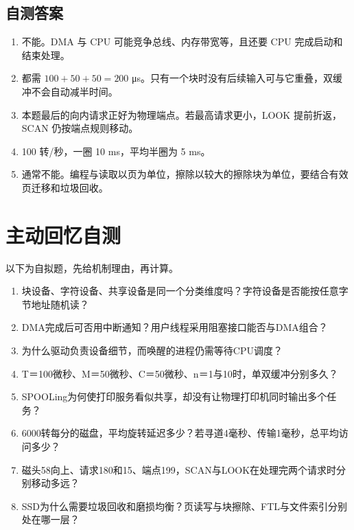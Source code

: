 \subsection{自测答案}\label{OS05-auto-3}

\begin{enumerate}
\def\labelenumi{\arabic{enumi}.}
\tightlist
\item
  不能。DMA 与 CPU 可能竞争总线、内存带宽等，且还要 CPU 完成启动和结束处理。
\item
  都需 \(100+50+50=200\) μs。只有一个块时没有后续输入可与它重叠，双缓冲不会自动减半时间。
\item
  本题最后的向内请求正好为物理端点。若最高请求更小，LOOK 提前折返，SCAN 仍按端点规则移动。
\item
  100 转/秒，一圈 10 ms，平均半圈为 5 ms。
\item
  通常不能。编程与读取以页为单位，擦除以较大的擦除块为单位，要结合有效页迁移和垃圾回收。
\end{enumerate}

\section{主动回忆自测}\label{OS05-recall}

以下为自拟题，先给机制理由，再计算。

\begin{recallcard}[从接口职责检查到机械与闪存过程]

\begin{enumerate}
\def\labelenumi{\arabic{enumi}.}
\tightlist
\item
  块设备、字符设备、共享设备是同一个分类维度吗？字符设备是否能按任意字节地址随机读？
\item
  DMA完成后可否用中断通知？用户线程采用阻塞接口能否与DMA组合？
\item
  为什么驱动负责设备细节，而唤醒的进程仍需等待CPU调度？
\item
  T＝100微秒、M＝50微秒、C＝50微秒、n＝1与10时，单双缓冲分别多久？
\item
  SPOOLing为何使打印服务看似共享，却没有让物理打印机同时输出多个任务？
\item
  6000转每分的磁盘，平均旋转延迟多少？若寻道4毫秒、传输1毫秒，总平均访问多少？
\item
  磁头58向上、请求180和15、端点199，SCAN与LOOK在处理完两个请求时分别移动多远？
\item
  SSD为什么需要垃圾回收和磨损均衡？页读写与块擦除、FTL与文件索引分别处在哪一层？
\end{enumerate}

\end{recallcard}

